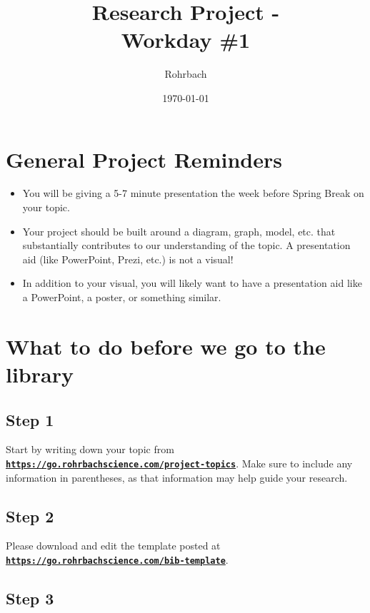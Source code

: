 \documentclass[10pt]{exam}
\title{Research Project - \\Workday \#1}
\author{Rohrbach}
\date{\today}
\begin{document}
\maketitle

\section*{General Project Reminders}

\begin{itemize}
  \item 
    You will be giving a 5-7 minute presentation the week before Spring Break on your topic.
  \item	
    Your project should be built around a diagram, graph, model, etc. that substantially contributes to our understanding of the topic.  A presentation aid (like PowerPoint, Prezi, etc.) is not a visual!
  \item
    In addition to your visual, you will likely want to have a presentation aid like a PowerPoint, a poster, or something similar.
  
\end{itemize}

\section*{What to do before we go to the library}

\subsection*{Step 1}
Start by writing down your topic from \texttt{\href{https://go.rohrbachscience.com/project-topics}{\bf https://go.rohrbachscience.com/project-topics}}.  Make sure to include any information in parentheses, as that information may help guide your research.

\begin{center}
  \fillin[][0.9\textwidth]
\end{center}

\subsection*{Step 2}

Please download and edit the template posted at \texttt{\href{https://go.rohrbachscience.com/bib-template}{\bf https://go.rohrbachscience.com/bib-template}}.

\subsection*{Step 3}
\end{document}
